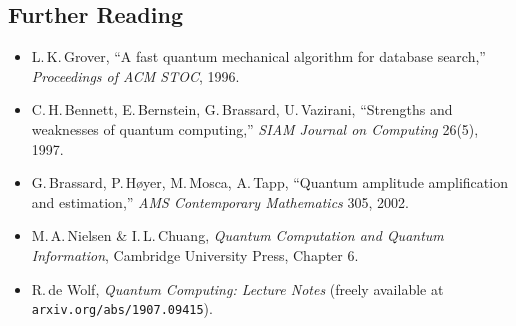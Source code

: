 \documentclass[12pt,a4paper]{article}
\begin{document}
\subsection*{Further Reading}

\begin{itemize}
  \item L.\,K.\,Grover, ``A fast quantum mechanical algorithm for database search,'' \textit{Proceedings of ACM STOC}, 1996.
  \item C.\,H.\,Bennett, E.\,Bernstein, G.\,Brassard, U.\,Vazirani, ``Strengths and weaknesses of quantum computing,'' \textit{SIAM Journal on Computing} 26(5), 1997.
  \item G.\,Brassard, P.\,Høyer, M.\,Mosca, A.\,Tapp, ``Quantum amplitude amplification and estimation,'' \textit{AMS Contemporary Mathematics} 305, 2002.
  \item M.\,A.\,Nielsen \& I.\,L.\,Chuang, \textit{Quantum Computation and Quantum Information}, Cambridge University Press, Chapter 6.
  \item R.\,de Wolf, \textit{Quantum Computing: Lecture Notes} (freely available at \texttt{arxiv.org/abs/1907.09415}).
\end{itemize}
\end{document}

